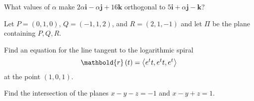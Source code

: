 \documentclass[12pt,addpoints]{exam}
\let\cos\relax\DeclareMathOperator{\cos}{\mathsf{cos}}
\let\sin\relax\DeclareMathOperator{\sin}{\mathsf{sin}}
\begin{document}
\begin{questions}

\question[15] What values of $\alpha$ make
$2\alpha\mathbold{i}-\alpha\mathbold{j}+16\mathbold{k}$
orthogonal to $5\mathbold{i}+\alpha\mathbold{j}-\mathbold{k}$?
\begin{solution}[1in]
\end{solution}
\ifprintanswers\else\newpage\fi

\question[40]
Let $P=\left(0,1,0\right)$, $Q=\left(-1,1,2\right)$,
and $R=\left(2,1,-1\right)$ and let $\Pi$ be the plane
containing $P,Q,R$.
\begin{solution}[1.75in]
\end{solution}

\question[20] Find an equation for the line
tangent to the logarithmic spiral
\[\mathbold{r}\left(t\right)
=\left\langle e^t\cos{t},e^t\sin{t},e^t\right\rangle\]
at the point $\left(1,0,1\right)$.
\begin{solution}[1in]
\end{solution}
\ifprintanswers\else\newpage\fi

\question[25] Find the intersection of the planes
$x-y-z=-1$ and $x-y+z=1$.
\begin{solution}[1in]
\end{solution}

\end{questions}
\end{document}
